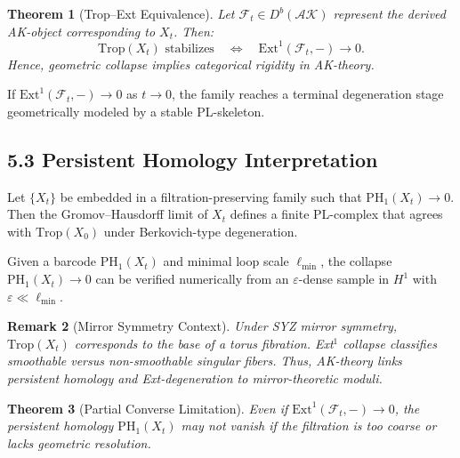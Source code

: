 \documentclass[11pt]{article}
\newtheorem{theorem}{Theorem}[section]
\newtheorem{remark}[theorem]{Remark}
\begin{document}
\begin{theorem}[Trop--Ext Equivalence]
Let $\mathcal{F}_t \in D^b(\mathcal{AK})$ represent the derived AK-object corresponding to $X_t$. Then:
\[
\mathrm{Trop}(X_t) \text{ stabilizes} \quad \Longleftrightarrow \quad \mathrm{Ext}^1(\mathcal{F}_t, -) \to 0.
\]
Hence, geometric collapse implies categorical rigidity in AK-theory.
\end{theorem}

\begin{corollary}
If $\mathrm{Ext}^1(\mathcal{F}_t, -) \to 0$ as $t \to 0$, the family reaches a terminal degeneration stage geometrically modeled by a stable PL-skeleton.
\end{corollary}

\subsection{5.3 Persistent Homology Interpretation}

\begin{lemma}
Let $\{X_t\}$ be embedded in a filtration-preserving family such that $\mathrm{PH}_1(X_t) \to 0$. Then the Gromov--Hausdorff limit of $X_t$ defines a finite PL-complex that agrees with $\mathrm{Trop}(X_0)$ under Berkovich-type degeneration.
\end{lemma}

\begin{proposition}
Given a barcode $\mathrm{PH}_1(X_t)$ and minimal loop scale $\ell_{\min}$, the collapse $\mathrm{PH}_1(X_t) \to 0$ can be verified numerically from an $\varepsilon$-dense sample in $H^1$ with $\varepsilon \ll \ell_{\min}$.
\end{proposition}

\begin{remark}[Mirror Symmetry Context]
Under SYZ mirror symmetry, $\mathrm{Trop}(X_t)$ corresponds to the base of a torus fibration. Ext$^1$ collapse classifies smoothable versus non-smoothable singular fibers. Thus, AK-theory links persistent homology and Ext-degeneration to mirror-theoretic moduli.
\end{remark}

\begin{theorem}[Partial Converse Limitation]
Even if $\mathrm{Ext}^1(\mathcal{F}_t, -) \to 0$, the persistent homology $\mathrm{PH}_1(X_t)$ may not vanish if the filtration is too coarse or lacks geometric resolution.
\end{theorem}
\end{document}
